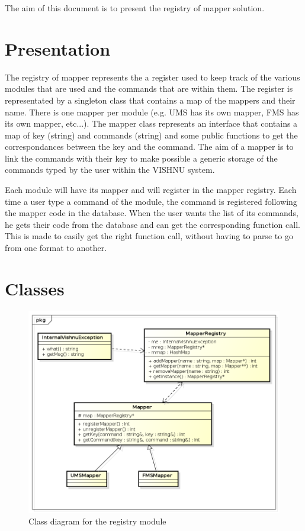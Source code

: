\documentclass{article}
\begin{document}
The aim of this document is to present the registry of mapper solution.

\section*{Presentation}
The registry of mapper represents the a register used to keep track of the 
various modules that are used and the commands that are within them. The 
register is representated by a singleton class that contains a map of the 
mappers and their name. There is one mapper per module (e.g. UMS has its own
mapper, FMS has its own mapper, etc...). The mapper class represents an 
interface that contains a map of key (string) and commands (string) and some 
public functions to get the correspondances between the key and the command. 
The aim of a mapper is to link the commands with their key to make possible a 
generic storage of the commands typed by the user within the VISHNU system. 

Each module will have its mapper and will register in the mapper registry. Each 
time a user type a command of the module, the command is registered following 
the mapper code in the database. When the user wants the list of its commands, 
he gets their code from the database and can get the corresponding function call.
This is made to easily get the right function call, without having to parse to go 
from one format to another.

\section*{Classes}

\begin{figure}[h]
\includegraphics[scale=0.8, angle=90]{image/mapperRegistry.png}
\caption{Class diagram for the registry module}
\end{figure}
\end{document}
